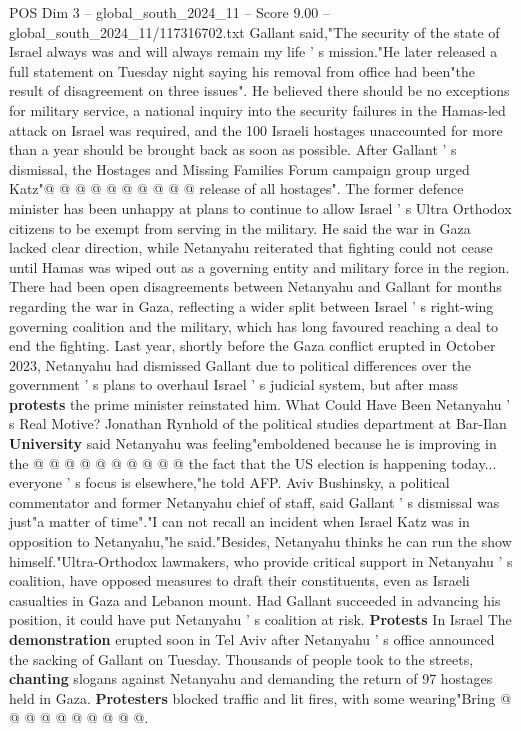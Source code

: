 \begin{textsample}{POS Dim 3 – global\_south\_2024\_11 – Score 9.00 – global\_south\_2024\_11/117316702.txt}
Gallant said,"The security of the state of Israel always was and will always remain my life ' s mission."He later released a full statement on Tuesday night saying his removal from office had been"the result of disagreement on three issues".
He believed there should be no exceptions for military service, a national inquiry into the security failures in the Hamas-led attack on Israel was required, and the 100 Israeli hostages unaccounted for more than a year should be brought back as soon as possible.
After Gallant ' s dismissal, the Hostages and Missing Families Forum campaign group urged Katz"@ @ @ @ @ @ @ @ @ @ release of all hostages".
The former defence minister has been unhappy at plans to continue to allow Israel ' s Ultra Orthodox citizens to be exempt from serving in the military.
He said the war in Gaza lacked clear direction, while Netanyahu reiterated that fighting could not cease until Hamas was wiped out as a governing entity and military force in the region.
There had been open disagreements between Netanyahu and Gallant for months regarding the war in Gaza, reflecting a wider split between Israel ' s right-wing governing coalition and the military, which has long favoured reaching a deal to end the fighting.
Last year, shortly before the Gaza conflict erupted in October 2023, Netanyahu had dismissed Gallant due to political differences over the government ' s plans to overhaul Israel ' s judicial system, but after mass \textbf{protests} the prime minister reinstated him.
What Could Have Been Netanyahu ' s Real Motive?
Jonathan Rynhold of the political studies department at Bar-Ilan \textbf{University} said Netanyahu was feeling"emboldened because he is improving in the @ @ @ @ @ @ @ @ @ @ the fact that the US election is happening today... everyone ' s focus is elsewhere,"he told AFP.
Aviv Bushinsky, a political commentator and former Netanyahu chief of staff, said Gallant ' s dismissal was just"a matter of time"."I can not recall an incident when Israel Katz was in opposition to Netanyahu,"he said."Besides, Netanyahu thinks he can run the show himself."Ultra-Orthodox lawmakers, who provide critical support in Netanyahu ' s coalition, have opposed measures to draft their constituents, even as Israeli casualties in Gaza and Lebanon mount.
Had Gallant succeeded in advancing his position, it could have put Netanyahu ' s coalition at risk. \textbf{Protests} In Israel The \textbf{demonstration} erupted soon in Tel Aviv after Netanyahu ' s office announced the sacking of Gallant on Tuesday.
Thousands of people took to the streets, \textbf{chanting} slogans against Netanyahu and demanding the return of 97 hostages held in Gaza. \textbf{Protesters} blocked traffic and lit fires, with some wearing"Bring @ @ @ @ @ @ @ @ @ @.

\end{textsample}
